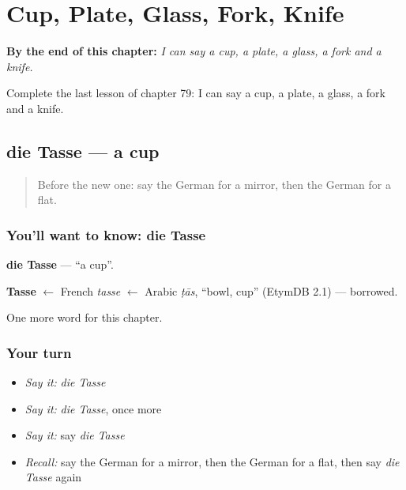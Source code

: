 
\chapter{Cup, Plate, Glass, Fork, Knife}
\label{ch:ge-cup-plate-glass-fork-knife}

\begin{chapteropening}
\textbf{By the end of this chapter:} \emph{I can say a cup, a plate, a glass, a fork and a knife.}

Complete the last lesson of chapter 79: I can say a cup, a plate, a glass, a fork and a knife.
\end{chapteropening}

\section[die Tasse]{die Tasse — a cup}

\label{lesson:GE-C79-tasse}



\begin{quote}
Before the new one: say the German for a mirror, then the German for a flat.
\end{quote}

\subsection*{You'll want to know: die Tasse}
\textbf{die Tasse} — \textquotedblleft{}a cup\textquotedblright{}.

\begin{cousinweb}
\textbf{Tasse} $\leftarrow$ French \emph{tasse} $\leftarrow$ Arabic \emph{ṭās}, \textquotedblleft{}bowl, cup\textquotedblright{} (EtymDB 2.1) — borrowed.
\end{cousinweb}

\begin{grammarlens}[title={What you've built}]
One more word for this chapter.
\end{grammarlens}

\subsection*{Your turn}
\begin{itemize}
\raggedright
  \item \emph{Say it:} \emph{die Tasse}
  \item \emph{Say it:} \emph{die Tasse}, once more
  \item \emph{Say it:} say \emph{die Tasse}
  \item \emph{Recall:} say the German for a mirror, then the German for a flat, then say \emph{die Tasse} again
\end{itemize}

